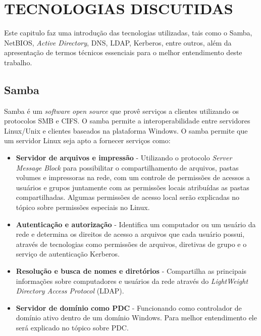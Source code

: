 \chapter{TECNOLOGIAS DISCUTIDAS}

Este capitulo faz uma introdução das tecnologias utilizadas, tais como o Samba, NetBIOS, \textit{Active Directory}, DNS, LDAP, Kerberos, entre outros, além da apresentação de termos técnicos essenciais para o melhor entendimento deste trabalho.

\section{Samba}

Samba é um \textit{software} \textit{open source} que provê serviços a clientes utilizando os protocolos SMB e CIFS.
O samba permite a interoperabilidade entre servidores Linux/Unix e clientes baseados na
plataforma Windows.
O samba permite que um servidor Linux seja apto a fornecer serviços como:
  \begin{itemize}
    \item \textbf{Servidor de arquivos e impressão} - Utilizando o protocolo \textit{Server Message Block} para possibilitar o compartilhamento de arquivos, pastas volumes e impressoras na rede, com um controle de permissões de acessos a usuários e grupos juntamente com as permissões locais atribuídas as pastas compartilhadas. Algumas permissões de acesso local serão explicadas no tópico sobre permissões especiais no Linux.

    \item \textbf{Autenticação e autorização} - Identifica um computador ou um usuário da rede e determina os direitos de acesso a arquivos que cada usuário possui, através de tecnologias como permissões de arquivos, diretivas de grupo e o serviço de autenticação Kerberos.

    \item \textbf{Resolução e busca de nomes e diretórios} - Compartilha as principais informações sobre computadores e usuários da rede através do \textit{LightWeight Directory Access Protocol} (LDAP).%

    \item \textbf{Servidor de domínio como PDC} - Funcionando como controlador de domínio ativo dentro de um domínio Windows. Para melhor entendimento ele será explicado no tópico sobre PDC.
  \end{itemize}

